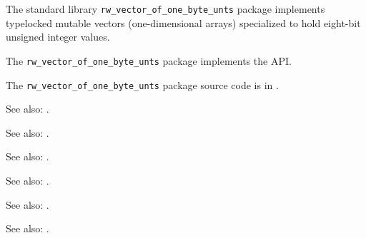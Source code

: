 
The standard library {\tt rw\_vector\_of\_one\_byte\_unts} package implements typelocked mutable vectors (one-dimensional arrays) 
specialized to hold eight-bit unsigned integer values.

The {\tt rw\_vector\_of\_one\_byte\_unts} package implements the  API.

The {\tt rw\_vector\_of\_one\_byte\_unts} package source code is in .

See also:  .

See also:  .

See also:  .

See also:  .

See also:  .

See also:  .




